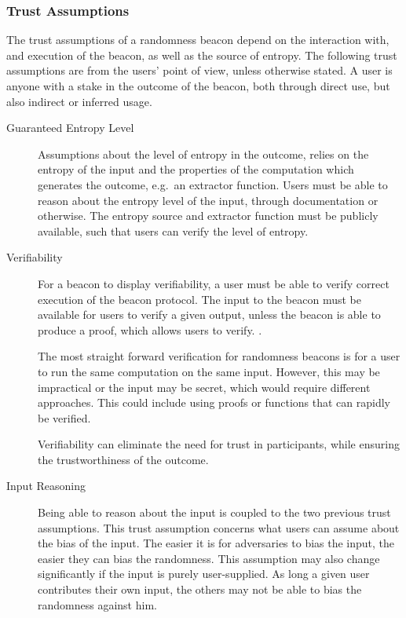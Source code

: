 \subsubsection{Trust Assumptions}\label{ssub:trust_assumptions}
The trust assumptions of a randomness beacon depend on the interaction with, and execution of the beacon, as well as the source of entropy.
The following trust assumptions are from the users' point of view, unless otherwise stated.
A user is anyone with a stake in the outcome of the beacon, both through direct use, but also indirect or inferred usage.
\begin{description}

    \item[Guaranteed Entropy Level]
        Assumptions about the level of entropy in the outcome, relies on the entropy of the input and the properties of the computation which generates the outcome, e.g.\ an extractor function.
        Users must be able to reason about the entropy level of the input, through documentation or otherwise.
        The entropy source and extractor function must be publicly available, such that users can verify the level of entropy.

    \item[Verifiability]
        For a beacon to display verifiability, a user must be able to verify correct execution of the beacon protocol.
        The input to the beacon must be available for users to verify a given output, unless the beacon is able to produce a proof, which allows users to verify. .

        The most straight forward verification for randomness beacons is for a user to run the same computation on the same input.
However, this may be impractical or the input may be secret, which would require different approaches.
This could include using proofs or functions that can rapidly be verified.

        Verifiability can eliminate the need for trust in participants, while ensuring the trustworthiness of the outcome.

    \item[Input Reasoning]
        Being able to reason about the input is coupled to the two previous trust assumptions.
This trust assumption concerns what users can assume about the bias of the input.
        The easier it is for adversaries to bias the input, the easier they can bias the randomness.
        This assumption may also change significantly if the input is purely user-supplied.
As long a given user contributes their own input, the others may not be able to bias the randomness against him.

\end{description}


